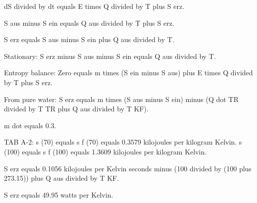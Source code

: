 dS divided by dt equals E times Q divided by T plus S erz.  

S aus minus S ein equals Q aus divided by T plus S erz.  

S erz equals S aus minus S ein plus Q aus divided by T.  

Stationary:  
S erz minus S aus minus S ein equals Q aus divided by T.  

Entropy balance:  
Zero equals m times (S ein minus S aus) plus E times Q divided by T plus S erz.  

From pure water:  
S erz equals m times (S aus minus S ein) minus (Q dot TR divided by T TR plus Q aus divided by T KF).  

m dot equals 0.3.  

TAB A-2:  
s (70) equals s f (70) equals 0.3579 kilojoules per kilogram Kelvin.  
s (100) equals s f (100) equals 1.3609 kilojoules per kilogram Kelvin.  

S erz equals 0.1056 kilojoules per Kelvin seconds minus (100 divided by (100 plus 273.15)) plus Q aus divided by T KF.  

S erz equals 49.95 watts per Kelvin.